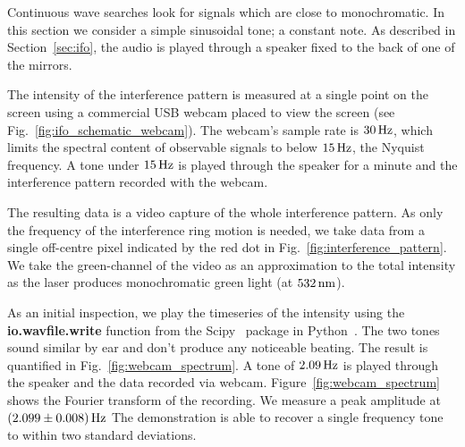 \documentclass[paper-main.tex]{subfiles}
\begin{document}

Continuous wave searches look for signals which are close to monochromatic. 
In this section we consider a simple sinusoidal tone; a constant note. 
As described in Section~\ref{sec:ifo}, the audio is played through a speaker fixed to the back of one of the mirrors.


The intensity of the interference pattern is measured at a single point on the screen using a commercial USB webcam placed to view the screen (see Fig.~\ref{fig:ifo_schematic_webcam}). 
The webcam's sample rate is $30\,{\rm Hz}$, which limits the spectral content of observable signals to below $15\,{\rm Hz}$, the Nyquist frequency.
A tone under $15\,{\rm Hz}$ is played through the speaker for a minute and the interference pattern recorded with the webcam. 


The resulting data is a video capture of the whole interference pattern. 
As only the frequency of the interference ring motion is needed, we take data from a single off-centre pixel indicated by the red dot in Fig.~\ref{fig:interference_pattern}. 
We take the green-channel of the video as an approximation to the total intensity as the laser produces monochromatic green light (at $532\,{\rm nm}$).


As an initial inspection, we play the timeseries of the intensity using the \textbf{io.wavfile.write} function from the Scipy~\cite{scipy} package in Python~\cite{python}. 
The two tones sound similar by ear and don't produce any noticeable beating. 
The result is quantified in Fig.~\ref{fig:webcam_spectrum}. 
A tone of $2.09\,{\rm Hz}$ is played through the speaker and the data recorded via webcam. 
Figure~\ref{fig:webcam_spectrum} shows the Fourier transform of the recording. 
We measure a peak amplitude at $(2.099\pm 0.008)\,{\rm Hz}$ 
The demonstration is able to recover a single frequency tone to within two standard deviations. 
\end{document}
